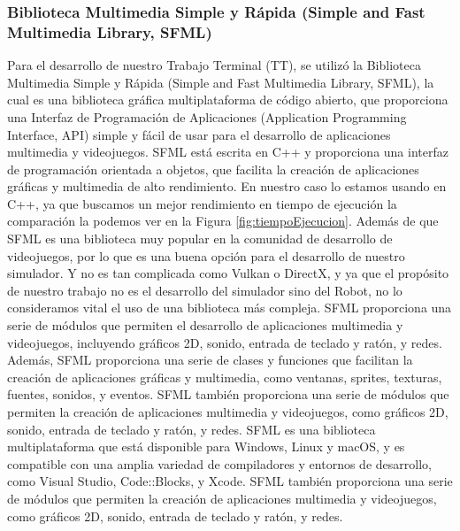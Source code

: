 \subsubsection{Biblioteca Multimedia Simple y R\'apida (Simple and Fast Multimedia Library, SFML)}
    Para el desarrollo de nuestro Trabajo Terminal (TT), se utiliz\'o la Biblioteca Multimedia Simple y R\'apida (Simple and Fast Multimedia Library, SFML), 
        la cual es una biblioteca gr\'afica multiplataforma de c\'odigo abierto, que proporciona una Interfaz de Programaci\'on de Aplicaciones (Application Programming Interface, API) simple y f\'acil de usar 
        para el desarrollo de aplicaciones multimedia y videojuegos. SFML est\'a escrita en C++ y proporciona una interfaz de 
        programaci\'on orientada a objetos, que facilita la creaci\'on de aplicaciones gr\'aficas y multimedia de alto rendimiento.
    \vskip 0.5cm
    En nuestro caso lo estamos usando en C++, ya que buscamos un mejor rendimiento en tiempo de ejecuci\'on la comparaci\'on la podemos ver
        en la Figura \ref{fig:tiempoEjecucion}. Adem\'as de que SFML es una biblioteca muy popular en la comunidad de desarrollo de videojuegos, por lo que es una buena opci\'on 
        para el desarrollo de nuestro simulador. Y no es tan complicada como Vulkan o DirectX, y ya que el prop\'osito de nuestro trabajo 
        no es el desarrollo del simulador sino del Robot, no lo consideramos vital el uso de una biblioteca m\'as compleja.
    \vskip 0.5cm
    SFML proporciona una serie de m\'odulos que permiten el desarrollo de aplicaciones multimedia y videojuegos, 
        incluyendo gr\'aficos 2D, sonido, entrada de teclado y rat\'on, y redes. Adem\'as, SFML proporciona una serie de 
        clases y funciones que facilitan la creaci\'on de aplicaciones gr\'aficas y multimedia, como ventanas, sprites, 
        texturas, fuentes, sonidos, y eventos. SFML tambi\'en proporciona una serie de m\'odulos que permiten la creaci\'on 
        de aplicaciones multimedia y videojuegos, como gr\'aficos 2D, sonido, entrada de teclado y rat\'on, y redes.
    \vskip 0.5cm
    SFML es una biblioteca multiplataforma que est\'a disponible para Windows, Linux y macOS, y es compatible con una 
        amplia variedad de compiladores y entornos de desarrollo, como Visual Studio, Code::Blocks, y Xcode. SFML tambi\'en 
        proporciona una serie de m\'odulos que permiten la creaci\'on de aplicaciones multimedia y videojuegos, como gr\'aficos 
        2D, sonido, entrada de teclado y rat\'on, y redes.
    \vskip 0.5cm
